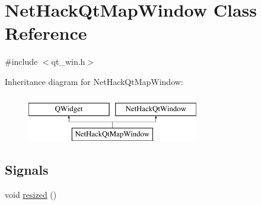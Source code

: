 \hypertarget{classNetHackQtMapWindow}{\section{Net\+Hack\+Qt\+Map\+Window Class Reference}
\label{classNetHackQtMapWindow}
}


{\ttfamily \#include $<$qt\+\_\+win.\+h$>$}

Inheritance diagram for Net\+Hack\+Qt\+Map\+Window\+:\begin{figure}[H]
\begin{center}
\leavevmode
\includegraphics[height=2.000000cm]{classNetHackQtMapWindow}
\end{center}
\end{figure}
\subsection*{Signals}
\begin{DoxyCompactItemize}
\item 
void \hyperlink{classNetHackQtMapWindow_a613cdb19b4a5f6eb14c9179f362cd045}{resized} ()
\end{DoxyCompactItemize}
